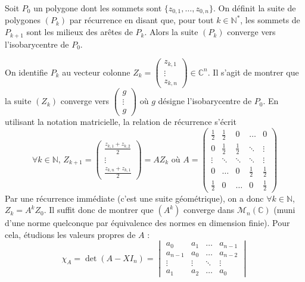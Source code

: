 
	\begin{theorem}
		Soit $P_0$ un polygone dont les sommets sont $\{ z_{0,1}, \dots, z_{0,n} \}$. On définit la suite de polygones $(P_k)$ par récurrence en disant que, pour tout $k \in \mathbb{N}^*$, les sommets de $P_{k+1}$ sont les milieux des arêtes de $P_k$.
		Alors la suite $(P_k)$ converge vers l'isobarycentre de $P_0$.
	\end{theorem}
	
	\begin{demonstration}
		On identifie $P_k$ au vecteur colonne $Z_k = \begin{pmatrix} z_{k,1} \\ \vdots \\ z_{k,n} \end{pmatrix} \in \mathbb{C}^n$. Il s'agit de montrer que la suite $(Z_k)$ converge vers $\begin{pmatrix} g \\ \vdots \\ g \end{pmatrix}$ où $g$ désigne l'isobarycentre de $P_0$.
		\newpar
		En utilisant la notation matricielle, la relation de récurrence s'écrit
		\[ \forall k \in \mathbb{N}, \, Z_{k+1} = \begin{pmatrix} \frac{z_{k,1} + z_{k,2}}{2} \\ \vdots \\ \frac{z_{k,n} + z_{k,1}}{2} \end{pmatrix} = AZ_k \text{ où } A = \begin{pmatrix} \frac{1}{2} & \frac{1}{2} & 0 & \dots & 0 \\ 0 & \frac{1}{2} & \frac{1}{2} & \ddots & \vdots \\ \vdots & \ddots & \ddots & \ddots & \vdots \\ 0 & \dots & 0 & \frac{1}{2} & \frac{1}{2} \\ \frac{1}{2} & 0 & \dots & 0 & \frac{1}{2} \end{pmatrix} \]
		Par une récurrence immédiate (c'est une suite géométrique), on a donc $\forall k \in \mathbb{N}$, $Z_k = A^k Z_0$. Il suffit donc de montrer que $(A^k)$ converge dans $\mathcal{M}_n(\mathbb{C})$ (muni d'une norme quelconque par équivalence des normes en dimension finie).
		\newpar
		Pour cela, étudions les valeurs propres de $A$ :
		\[ \chi_A = \det(A - X I_n) = \begin{vmatrix} a_0 & a_1 & \dots & a_{n-1} \\ a_{n-1} & a_0 & \dots & a_{n-2}\\ \vdots & \vdots & \ddots & \vdots \\ a_1 & a_2 & \dots & a_0 \end{vmatrix} \]

\end{demonstration}
